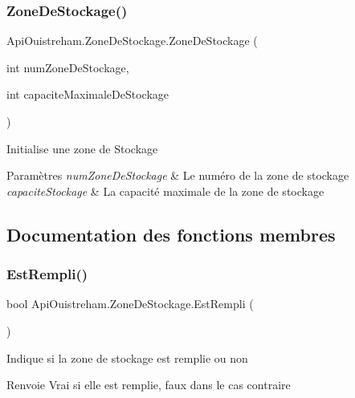 \subsubsection{\texorpdfstring{Zone\+De\+Stockage()}{ZoneDeStockage()}}
{\footnotesize\ttfamily Api\+Ouistreham.\+Zone\+De\+Stockage.\+Zone\+De\+Stockage (\begin{DoxyParamCaption}\item[{int}]{num\+Zone\+De\+Stockage,  }\item[{int}]{capacite\+Maximale\+De\+Stockage }\end{DoxyParamCaption})}



Initialise une zone de Stockage 


\begin{DoxyParams}{Paramètres}
{\em num\+Zone\+De\+Stockage} & Le numéro de la zone de stockage\\
\hline
{\em capacite\+Stockage} & La capacité maximale de la zone de stockage\\
\hline
\end{DoxyParams}


\subsection{Documentation des fonctions membres}
\mbox{\label{class_api_ouistreham_1_1_zone_de_stockage_a1eccb93eee9a439dbe470c88ea2bb4ca}} 
\subsubsection{\texorpdfstring{Est\+Rempli()}{EstRempli()}}
{\footnotesize\ttfamily bool Api\+Ouistreham.\+Zone\+De\+Stockage.\+Est\+Rempli (\begin{DoxyParamCaption}{ }\end{DoxyParamCaption})}



Indique si la zone de stockage est remplie ou non 

\begin{DoxyReturn}{Renvoie}
Vrai si elle est remplie, faux dans le cas contraire
\end{DoxyReturn}
\mbox{\label{class_api_ouistreham_1_1_zone_de_stockage_a04b272fa2b5792ebdb7d4071f1ea5189}} 

